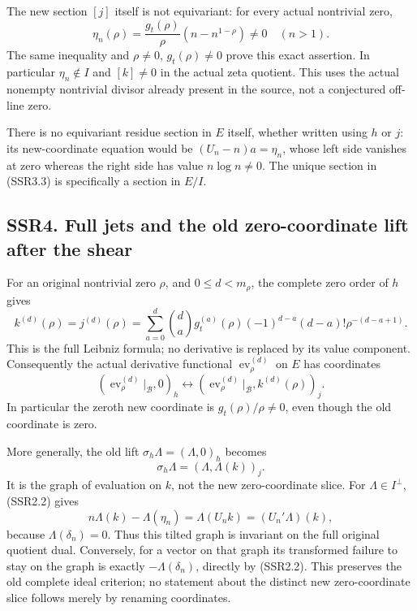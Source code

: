 The new section \([j]\) itself is not equivariant: for every actual
nontrivial zero, \[
\eta_n(\rho)=\frac{g_t(\rho)}{\rho}
                  (n-n^{1-\rho})\ne0\quad(n>1).
\tag{SSR3.5}
\] The same inequality and \(\rho\ne0\), \(g_t(\rho)\ne0\) prove this
exact assertion. In particular \(\eta_n\notin I\) and \([k]\ne0\) in the
actual zeta quotient. This uses the actual nonempty nontrivial divisor
already present in the source, not a conjectured off-line zero.

There is no equivariant residue section in \(E\) itself, whether written
using \(h\) or \(j\): its new-coordinate equation would be
\((U_n-n)a=\eta_n\), whose left side vanishes at zero whereas the right
side has value \(n\log n\ne0\). The unique section in (SSR3.3) is
specifically a section in \(E/I\).

\subsection{SSR4. Full jets and the old zero-coordinate lift after the
shear}\label{ssr4.-full-jets-and-the-old-zero-coordinate-lift-after-the-shear}

For an original nontrivial zero \(\rho\), and \(0\le d<m_\rho\), the
complete zero order of \(h\) gives \[
k^{(d)}(\rho)=j^{(d)}(\rho)
=\sum_{a=0}^d\binom da g_t^{(a)}(\rho)
       (-1)^{d-a}(d-a)!\rho^{-(d-a+1)}.
\tag{SSR4.1}
\] This is the full Leibniz formula; no derivative is replaced by its
value component. Consequently the actual derivative functional
\(\operatorname{ev}_\rho^{(d)}\) on \(E\) has coordinates \[
(\operatorname{ev}_\rho^{(d)}|_{\mathcal B},0)_h
\longleftrightarrow
(\operatorname{ev}_\rho^{(d)}|_{\mathcal B},k^{(d)}(\rho))_j.
\tag{SSR4.2}
\] In particular the zeroth new coordinate is \(g_t(\rho)/\rho\ne0\),
even though the old coordinate is zero.

More generally, the old lift \(\sigma_h\Lambda=(\Lambda,0)_h\) becomes
\[
\sigma_h\Lambda=(\Lambda,\Lambda(k))_j.
\tag{SSR4.3}
\] It is the graph of evaluation on \(k\), not the new zero-coordinate
slice. For \(\Lambda\in I^\perp\), (SSR2.2) gives \[
n\Lambda(k)-\Lambda(\eta_n)
=\Lambda(U_nk)=(U_n'\Lambda)(k),
\tag{SSR4.4}
\] because \(\Lambda(\delta_n)=0\). Thus this tilted graph is invariant
on the full original quotient dual. Conversely, for a vector on that
graph its transformed failure to stay on the graph is exactly
\(-\Lambda(\delta_n)\), directly by (SSR2.2). This preserves the old
complete ideal criterion; no statement about the distinct new
zero-coordinate slice follows merely by renaming coordinates.

